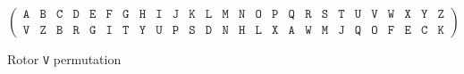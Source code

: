 \begin{center}
  \begin{figure}[h]
    \[
      \left(
        \begin{array}{llllllllllllllllllllllllll}
          \texttt{A} & \texttt{B} & \texttt{C} & \texttt{D} &
          \texttt{E} & \texttt{F} & \texttt{G} & \texttt{H} &
          \texttt{I} & \texttt{J} & \texttt{K} & \texttt{L} &
          \texttt{M} & \texttt{N} & \texttt{O} & \texttt{P} &
          \texttt{Q} & \texttt{R} & \texttt{S} & \texttt{T} &
          \texttt{U} & \texttt{V} & \texttt{W} & \texttt{X} &
          \texttt{Y} & \texttt{Z}                             \\
          \texttt{V} & \texttt{Z} & \texttt{B} & \texttt{R} &
          \texttt{G} & \texttt{I} & \texttt{T} & \texttt{Y} &
          \texttt{U} & \texttt{P} & \texttt{S} & \texttt{D} &
          \texttt{N} & \texttt{H} & \texttt{L} & \texttt{X} &
          \texttt{A} & \texttt{W} & \texttt{M} & \texttt{J} &
          \texttt{Q} & \texttt{O} & \texttt{F} & \texttt{E} &
          \texttt{C} & \texttt{K}
        \end{array}
      \right)
    \]
    \caption{Rotor \texttt{V} permutation~\cite{cryptomuseumEnigmaWiring}}
    \label{fig:rotor_v_wiring}
  \end{figure}
\end{center}

